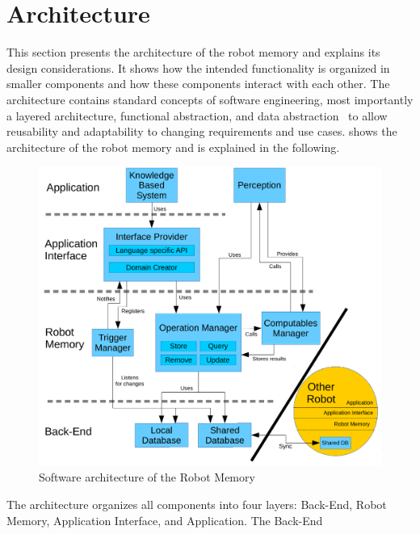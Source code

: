 {\section{Architecture}
\label{sec:architecture}
This section presents the architecture of the robot memory and
explains its design considerations. It shows how the intended
functionality is organized in smaller components and how these
components interact with each other. The architecture contains
standard concepts of software engineering, most importantly a layered
architecture, functional abstraction, and data
abstraction~\cite{software-architecture} to allow
reusability and adaptability to changing requirements and use cases.
 shows the architecture of the robot
memory and is explained in the following.
\begin{figure}
  \centering
  \includegraphics[width=\textwidth]{architecture.pdf}
  \vspace{-5mm}
  \caption[Software architecture of the Robot Memory]{Software architecture of the Robot Memory}
  \label{fig:arch}
  \vspace{-5mm}
\end{figure}
The architecture organizes all components into four layers: Back-End,
Robot Memory, Application Interface, and Application. The Back-End
}
